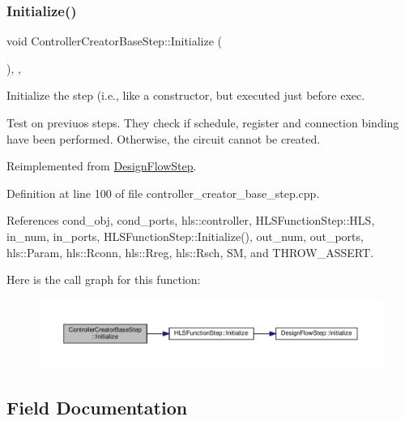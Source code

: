 \subsubsection{\texorpdfstring{Initialize()}{Initialize()}}
{\footnotesize\ttfamily void Controller\+Creator\+Base\+Step\+::\+Initialize (\begin{DoxyParamCaption}{ }\end{DoxyParamCaption})\hspace{0.3cm}{\ttfamily [override]}, {\ttfamily [protected]}, {\ttfamily [virtual]}}



Initialize the step (i.\+e., like a constructor, but executed just before exec. 

Test on previuos steps. They check if schedule, register and connection binding have been performed. Otherwise, the circuit cannot be created. 

Reimplemented from \hyperlink{classDesignFlowStep_a44b50683382a094976e1d432a7784799}{Design\+Flow\+Step}.



Definition at line 100 of file controller\+\_\+creator\+\_\+base\+\_\+step.\+cpp.



References cond\+\_\+obj, cond\+\_\+ports, hls\+::controller, H\+L\+S\+Function\+Step\+::\+H\+LS, in\+\_\+num, in\+\_\+ports, H\+L\+S\+Function\+Step\+::\+Initialize(), out\+\_\+num, out\+\_\+ports, hls\+::\+Param, hls\+::\+Rconn, hls\+::\+Rreg, hls\+::\+Rsch, SM, and T\+H\+R\+O\+W\+\_\+\+A\+S\+S\+E\+RT.

Here is the call graph for this function\+:
\nopagebreak
\begin{figure}[H]
\begin{center}
\leavevmode
\includegraphics[width=350pt]{d5/d28/classControllerCreatorBaseStep_a1446309080149bf6370ae3a9d1e18feb_cgraph}
\end{center}
\end{figure}


\subsection{Field Documentation}
\mbox{\label{classControllerCreatorBaseStep_a6171b5c8241664c0d19f858bdd815a17}} 
